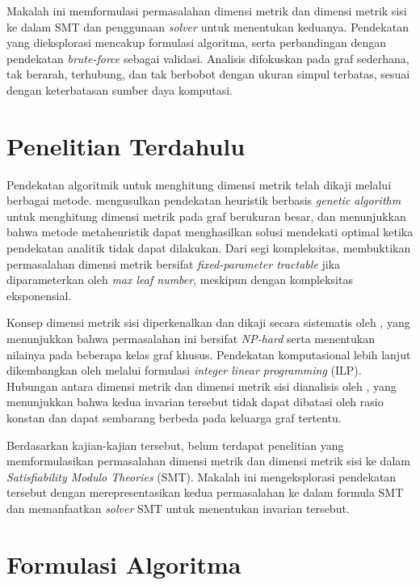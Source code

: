 \documentclass[10pt,twocolumn]{article}
\newcommand{\foreign}[1]{\foreignlanguage{english}{\textit{#1}}}
\begin{document}
Makalah ini memformulasi permasalahan dimensi metrik dan dimensi metrik sisi ke dalam SMT dan penggunaan \foreign{solver} untuk menentukan keduanya. Pendekatan yang dieksplorasi mencakup formulasi algoritma, serta perbandingan dengan pendekatan \foreign{brute-force} sebagai validasi. Analisis difokuskan pada graf sederhana, tak berarah, terhubung, dan tak berbobot dengan ukuran simpul terbatas, sesuai dengan keterbatasan sumber daya komputasi.

\section{Penelitian Terdahulu}

Pendekatan algoritmik untuk menghitung dimensi metrik telah dikaji melalui berbagai metode. \cite{kratica2007} mengusulkan pendekatan heuristik berbasis \foreign{genetic algorithm} untuk menghitung dimensi metrik pada graf berukuran besar, dan menunjukkan bahwa metode metaheuristik dapat menghasilkan solusi mendekati optimal ketika pendekatan analitik tidak dapat dilakukan. Dari segi kompleksitas, \cite{eppstein2015} membuktikan permasalahan dimensi metrik bersifat \foreign{fixed-parameter tractable} jika diparameterkan oleh \emph{max leaf number}, meskipun dengan kompleksitas eksponensial.

Konsep dimensi metrik sisi diperkenalkan dan dikaji secara sistematis oleh \cite{kelenc2018}, yang menunjukkan bahwa permasalahan ini bersifat \foreign{NP-hard} serta menentukan nilainya pada beberapa kelas graf khusus. Pendekatan komputasional lebih lanjut dikembangkan oleh \cite{klavzar2020} melalui formulasi \foreign{integer linear programming} (ILP). Hubungan antara dimensi metrik dan dimensi metrik sisi dianalisis oleh \cite{knor2021}, yang menunjukkan bahwa kedua invarian tersebut tidak dapat dibatasi oleh rasio konstan dan dapat sembarang berbeda pada keluarga graf tertentu.

Berdasarkan kajian-kajian tersebut, belum terdapat penelitian yang memformulasikan permasalahan dimensi metrik dan dimensi metrik sisi ke dalam \foreign{Satisfiability Modulo Theories} (SMT). Makalah ini mengeksplorasi pendekatan tersebut dengan merepresentasikan kedua permasalahan ke dalam formula SMT dan memanfaatkan \foreign{solver} SMT untuk menentukan invarian tersebut.

\section{Formulasi Algoritma}
\label{sec:alg}
\end{document}
